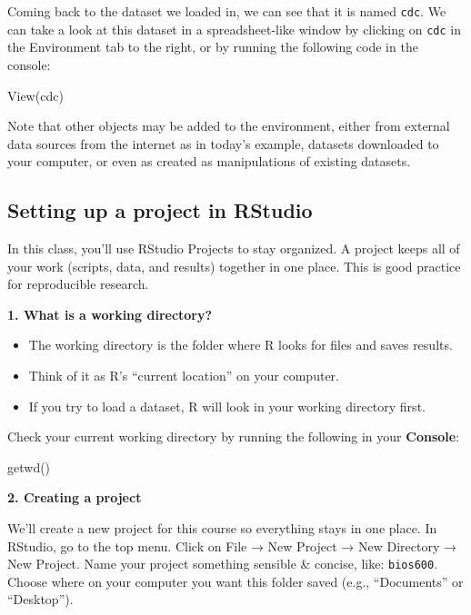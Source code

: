 \documentclass[
  letterpaper,
  DIV=11,
  numbers=noendperiod]{scrartcl}
\newenvironment{Shaded}{\begin{snugshade}}{\end{snugshade}}
\newcommand{\FunctionTok}[1]{\textcolor[rgb]{0.28,0.35,0.67}{#1}}
\newcommand{\NormalTok}[1]{\textcolor[rgb]{0.00,0.23,0.31}{#1}}
\begin{document}
Coming back to the dataset we loaded in, we can see that it is named
\texttt{cdc}. We can take a look at this dataset in a spreadsheet-like
window by clicking on \texttt{cdc} in the Environment tab to the right,
or by running the following code in the console:

\begin{Shaded}
\begin{Highlighting}[]
\FunctionTok{View}\NormalTok{(cdc)}
\end{Highlighting}
\end{Shaded}

Note that other objects may be added to the environment, either from
external data sources from the internet as in today's example, datasets
downloaded to your computer, or even as created as manipulations of
existing datasets.

\subsection{Setting up a project in
RStudio}\label{setting-up-a-project-in-rstudio}

In this class, you'll use RStudio Projects to stay organized. A project
keeps all of your work (scripts, data, and results) together in one
place. This is good practice for reproducible research.

\textbf{1. What is a working directory?}

\begin{itemize}
\item
  The working directory is the folder where R looks for files and saves
  results.
\item
  Think of it as R's ``current location'' on your computer.
\item
  If you try to load a dataset, R will look in your working directory
  first.
\end{itemize}

Check your current working directory by running the following in your
\textbf{Console}:

\begin{Shaded}
\begin{Highlighting}[]
\FunctionTok{getwd}\NormalTok{()}
\end{Highlighting}
\end{Shaded}

\textbf{2. Creating a project}

We'll create a new project for this course so everything stays in one
place. In RStudio, go to the top menu. Click on File → New Project → New
Directory → New Project. Name your project something sensible \&
concise, like: \texttt{bios600}. Choose where on your computer you want
this folder saved (e.g., ``Documents'' or ``Desktop'').
\end{document}
